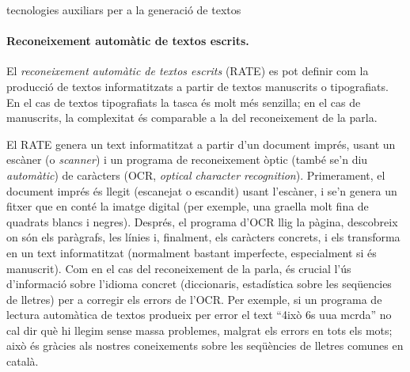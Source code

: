 \begin{persabermes}{tecnologies auxiliars per a la generació de textos}
  \paragraph{Reconeixement automàtic de textos escrits.}
  El \emph{reconeixement automàtic de textos escrits} (RATE) es pot
  definir com la producció de textos informatitzats a partir de textos
  manuscrits o tipografiats. En el cas de textos tipografiats la tasca
  és molt més senzilla; en el cas de manuscrits, la complexitat és
  comparable a la del reconeixement de la parla.
  
  El RATE genera un text informatitzat a partir d'un document imprés,
  usant un escàner (o \emph{scanner}) i un programa de reconeixement
  òptic (també se'n diu {\em automàtic}) de caràcters (OCR,
  \emph{optical character recognition}).  Primerament, el document
  imprés és llegit (escanejat o escandit) usant l'escàner, i se'n
  genera un fitxer que en conté la imatge digital (per exemple, una
  graella molt fina de quadrats blancs i negres).  Després, el
  programa d'OCR llig la pàgina, descobreix on són els paràgrafs, les
  línies i, finalment, els caràcters concrets, i els transforma en un
  text informatitzat (normalment bastant imperfecte, especialment si
  és manuscrit).  Com en el cas del reconeixement de la parla, és
  crucial l'ús d'informació sobre l'idioma concret (diccionaris,
  estadística sobre les seqüencies de lletres) per a corregir els
  errors de l'OCR.  Per exemple, si un programa de lectura automàtica
  de textos produeix per error el text ``4ixò 6s uua mcrda'' no cal
  dir què hi llegim sense massa problemes, malgrat els errors en tots
  els mots; això és gràcies als nostres coneixements sobre les
  seqüències de lletres comunes en català.
\end{persabermes}

